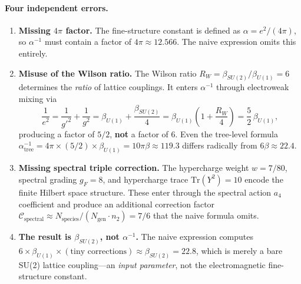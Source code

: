 \documentclass[12pt,a4paper]{article}
\begin{document}
\paragraph{Four independent errors.}
\begin{enumerate}
\item \textbf{Missing $4\pi$ factor.}
  The fine-structure constant is defined as $\alpha = e^2/(4\pi)$, so
  $\alpha^{-1}$ must contain a factor of $4\pi \approx 12.566$.
  The naive expression omits this entirely.

\item \textbf{Misuse of the Wilson ratio.}
  The Wilson ratio $R_W = \beta_{SU(2)}/\beta_{U(1)} = 6$ determines the
  \emph{ratio} of lattice couplings.  It enters $\alpha^{-1}$ through
  electroweak mixing via
  \begin{equation}
  \frac{1}{e^2} = \frac{1}{g'^2} + \frac{1}{g^2}
    = \beta_{U(1)} + \frac{\beta_{SU(2)}}{4}
    = \beta_{U(1)}\!\left(1 + \frac{R_W}{4}\right)
    = \frac{5}{2}\,\beta_{U(1)},
  \end{equation}
  producing a factor of $5/2$, \textbf{not} a factor of $6$.
  Even the tree-level formula $\alpha^{-1}_{\mathrm{tree}} = 4\pi \times
  (5/2) \times \beta_{U(1)} = 10\pi\beta \approx 119.3$ differs radically
  from $6\beta \approx 22.4$.

\item \textbf{Missing spectral triple correction.}
  The hypercharge weight $w = 7/80$, spectral grading $g_F = 8$, and
  hypercharge trace $\mathrm{Tr}(Y^2)=10$ encode the finite Hilbert space
  structure.  These enter through the spectral action $a_4$ coefficient and
  produce an additional correction factor $\mathcal{C}_{\mathrm{spectral}}
  \approx N_{\mathrm{species}}/(N_{\mathrm{gen}} \cdot n_2) = 7/6$ that the
  naive formula omits.

\item \textbf{The result is $\beta_{SU(2)}$, not $\alpha^{-1}$.}
  The naive expression computes $6 \times \beta_{U(1)} \times
  (\text{tiny corrections}) \approx \beta_{SU(2)} = 22.8$, which is merely
  a bare SU(2) lattice coupling---an \emph{input parameter}, not the
  electromagnetic fine-structure constant.
\end{enumerate}
\end{document}
